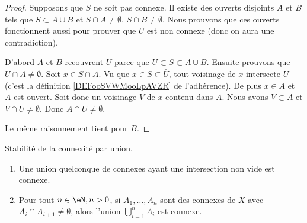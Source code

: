 \begin{proof}
	Supposons que \( S\) ne soit pas connexe. Il existe des ouverts disjoints \( A\) et \( B\) tels que \( S\subset A\cup B\) et \( S\cap A\neq\emptyset\), \( S\cap B\neq\emptyset\). Nous prouvons que ces ouverts fonctionnent aussi pour prouver que \( U\) est non connexe (donc on aura une contradiction).

	D'abord \( A\) et \( B\) recouvrent \( U\) parce que \( U\subset S\subset A\cup B\). Ensuite prouvons que \( U\cap A\neq \emptyset\). Soit \( x\in S\cap A\). Vu que \( x\in S\subset\bar U\), tout voisinage de \( x\) intersecte \( U\) (c'est la définition \ref{DEFooSVWMooLpAVZR} de l'adhérence). De plus \( x\in A\) et \( A\) est ouvert. Soit donc un voisinage \( V\) de \( x\) contenu dans \( A\). Nous avons \( V\subset A\) et \( V\cap U\neq \emptyset\). Donc \( A\cap U\neq \emptyset\).

	Le même raisonnement tient pour \( B\).
\end{proof}

\begin{proposition} \label{PropIWIDzzH}
	Stabilité de la connexité par union.
	\begin{enumerate}
		\item       \label{ITEMooLVSSooTGstBz}
		      Une union quelconque de connexes ayant une intersection non vide est connexe.
		\item
		      Pour tout \( n \in \eN, n > 0 \), si \( A_1,\ldots, A_n\) sont des connexes de \( X\) avec \( A_i\cap A_{i+1}\neq \emptyset\), alors l'union \( \bigcup_{i=1}^nA_i\) est connexe.
	\end{enumerate}
\end{proposition}

